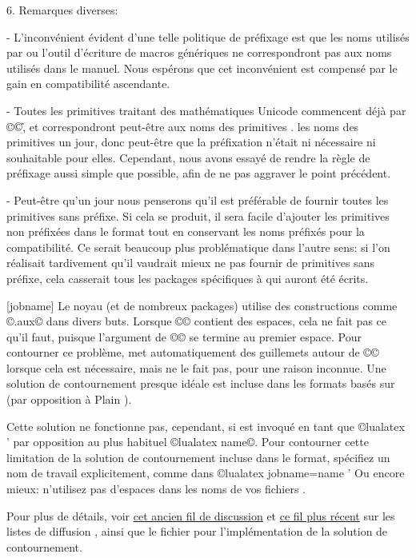 \documentclass{lltxdoc}
\begin{document}
6. Remarques diverses:

- L'inconvénient évident d'une telle politique de préfixage est que les noms utilisés par \latex ou l'outil d'écriture de macros génériques ne correspondront pas aux noms utilisés dans le manuel. Nous espérons que cet inconvénient est compensé par le gain en compatibilité ascendante.

- Toutes les primitives traitant des mathématiques Unicode commencent déjà par ©\U©, et correspondront peut-être aux noms des primitives \xetex. les noms des primitives \xetex un jour, donc peut-être que la préfixation n'était ni nécessaire ni souhaitable pour elles. Cependant, nous avons essayé de rendre la règle de préfixage aussi simple que possible, afin de ne pas aggraver le point précédent.

- Peut-être qu'un jour nous penserons qu'il est préférable de fournir toutes les primitives sans préfixe. Si cela se produit, il sera facile d'ajouter les primitives non préfixées dans le format tout en conservant les noms préfixés pour la compatibilité. Ce serait beaucoup plus problématique dans l'autre sens: si l'on réalisait tardivement qu'il vaudrait mieux ne pas fournir de primitives sans préfixe, cela casserait tous les packages spécifiques à \luatex qui auront été écrits.


[jobname]
Le noyau \latex (et de nombreux packages) utilise des constructions comme
©\jobname.aux© dans divers buts. Lorsque ©\jobname© contient des espaces,
cela ne fait pas ce qu'il faut, puisque l'argument de ©© se termine au
premier espace. Pour contourner ce problème, \pdftex met automatiquement des
guillemets autour de ©\jobname© lorsque cela est nécessaire, mais \luatex ne le fait pas,
pour une raison inconnue. Une solution de contournement presque idéale
est incluse dans les formats \luatex basés sur \latex (par opposition à Plain \tex).

Cette solution ne fonctionne pas, cependant, si \luatex est invoqué en tant
que ©lualatex ' par opposition au plus habituel ©lualatex name©.
Pour contourner cette limitation de la solution de contournement incluse dans le format,
spécifiez un nom de travail explicitement, comme dans
©lualatex jobname=name ' Ou encore mieux: n'utilisez pas d'espaces
dans les noms de vos fichiers \tex.

Pour plus de détails, voir \href{http://www.ntg.nl/pipermail/dev-luatex/2009-April/002549.html}{cet
ancien fil de discussion} et \href{http://tug.org/pipermail/luatex/2010-August/001986.html}{ce fil
plus récent} sur les listes de diffusion \luatex, ainsi que le fichier 
pour l'implémentation de la solution de contournement.
\end{document}
